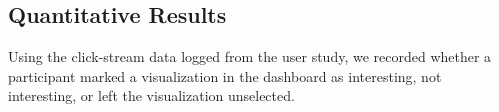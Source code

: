 \subsection{Quantitative Results}
 Using the click-stream data logged from the user study, we recorded whether a participant marked a visualization in the dashboard as interesting, not interesting, or left the visualization unselected. %

